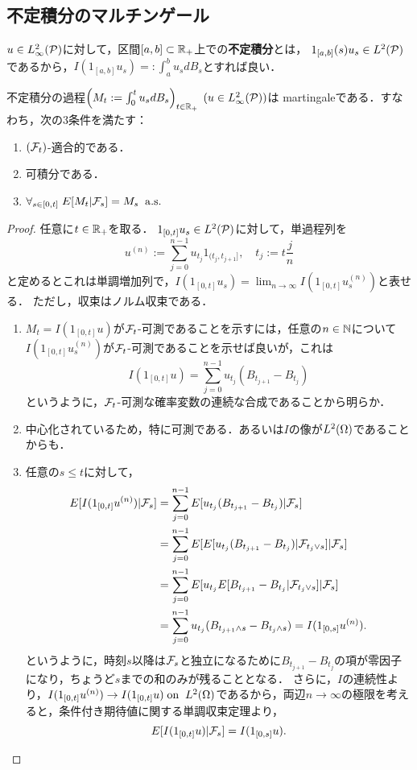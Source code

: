 \documentclass[uplatex,dvipdfmx]{jsreport}
\begin{document}
\subsection{不定積分のマルチンゲール}

\begin{definition}
    $u\in L^2_\infty(\P)$に対して，区間$[a,b]\subset\R_+$上での\textbf{不定積分}とは，
    $1_{[a,b]}(s)u_s\in L^2(\P)$であるから，$I(1_{[a,b]}u_s)=:\int^b_au_sdB_s$とすれば良い．
\end{definition}

\begin{proposition}
    不定積分の過程$\paren{M_t:=\int^t_0 u_sdB_s}_{t\in\R_+}\;(u\in L^2_\infty(\P))$は
    martingaleである．すなわち，次の3条件を満たす：
    \begin{enumerate}
        \item $(\F_t)$-適合的である．
        \item 可積分である．
        \item $\forall_{s\in[0,t]}\;E[M_t|\F_s]=M_s\;\as$
    \end{enumerate}
\end{proposition}
\begin{proof}
    任意に$t\in\R_+$を取る．
    $1_{[0,t]}u_s\in L^2(\P)$に対して，単過程列を
    \[u^{(n)}:=\sum_{j=0}^{n-1}u_{t_j}1_{(t_j,t_{j+1}]},\quad t_j:=t\frac{j}{n}\]
    と定めるとこれは単調増加列で，$I(1_{[0,t]}u_s)=\lim_{n\to\infty}I(1_{[0,t]}u_s^{(n)})$と表せる．
    ただし，収束はノルム収束である．
    \begin{enumerate}
        \item 
        $M_t=I(1_{[0,t]}u)$が$\F_t$-可測であることを示すには，任意の$n\in\N$について$I(1_{[0,t]}u_s^{(n)})$が$\F_t$-可測であることを示せば良いが，これは
        \[I(1_{[0,t]}u)=\sum_{j=0}^{n-1}u_{t_j}(B_{t_{j+1}}-B_{t_j})\]
        というように，$\F_t$-可測な確率変数の連続な合成であることから明らか．
        \item 中心化されているため，特に可測である．あるいは$I$の像が$L^2(\Om)$であることからも．
        \item 任意の$s\le t$に対して，
        \begin{align*}
            E[I(1_{[0,t]}u^{(n)})|\F_s]&=\sum^{n-1}_{j=0}E[u_{t_j}(B_{t_{j+1}}-B_{t_j})|\F_s]\\
            &=\sum^{n-1}_{j=0}E[E[u_{t_j}(B_{t_{j+1}}-B_{t_j})|\F_{t_j\lor s}]|\F_s]\\
            &=\sum^{n-1}_{j=0}E[u_{t_{j}}E[B_{t_{j+1}}-B_{t_j}|\F_{t_j\lor s}]|\F_s]\\
            &=\sum_{j=0}^{n-1}u_{t_j}(B_{t_{j+1}\land s}-B_{t_j\land s})=I(1_{[0,s]}u^{(n)}).
        \end{align*}
        というように，時刻$s$以降は$\F_s$と独立になるために$B_{t_{j+1}}-B_{t_j}$の項が零因子になり，ちょうど$s$までの和のみが残ることとなる．
        さらに，$I$の連続性より，$I(1_{[0,t]}u^{(n)})\to I(1_{[0,t]}u)\;\on\;L^2(\Om)$であるから，両辺$n\to\infty$の極限を考えると，条件付き期待値に関する単調収束定理より，
        \[E[I(1_{[0,t]}u)|\F_s]=I(1_{[0,s]}u).\]
    \end{enumerate}
\end{proof}
\end{document}

